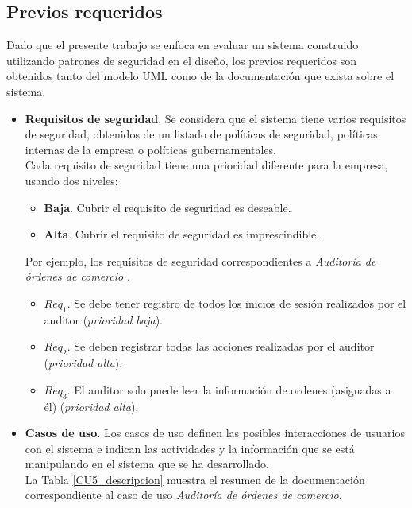 \subsection*{Previos requeridos}

Dado que el presente trabajo se enfoca en evaluar un sistema construido utilizando patrones de seguridad en el diseño, los previos requeridos son obtenidos tanto del modelo UML como de la documentación que exista sobre el sistema. 

\begin{itemize}
	\item \textbf{Requisitos de seguridad}. Se considera que el sistema tiene varios requisitos de seguridad, obtenidos de un listado de políticas de seguridad, políticas internas de la empresa o políticas gubernamentales. \\
	Cada requisito de seguridad tiene una prioridad diferente para la empresa, usando dos niveles:
	\begin{itemize}[noitemsep]
		\item \textbf{Baja}. Cubrir el requisito de seguridad es deseable.
		\item \textbf{Alta}. Cubrir el requisito de seguridad es imprescindible. 
	\end{itemize}
	Por ejemplo, los requisitos de seguridad correspondientes a \textit{Auditoría de órdenes de comercio} .
	\begin{itemize}[noitemsep]
		\item $Req_1$. Se debe tener registro de todos los inicios de sesión realizados por el auditor (\textit{prioridad baja}). 
		\item $Req_2$. Se deben registrar todas las acciones realizadas por el auditor (\textit{prioridad alta}).
		\item $Req_3$. El auditor solo puede leer la información de ordenes (asignadas a él) (\textit{prioridad alta}).
	\end{itemize}
	\item \textbf{Casos de uso}. Los casos de uso definen las posibles interacciones de usuarios con el sistema e indican las actividades y la información que se está manipulando en el sistema que se ha desarrollado.\\
	La Tabla \ref{CU5_descripcion} muestra el resumen de la documentación correspondiente al caso de uso \textit{Auditoría de órdenes de comercio}. 
	

\end{itemize}
